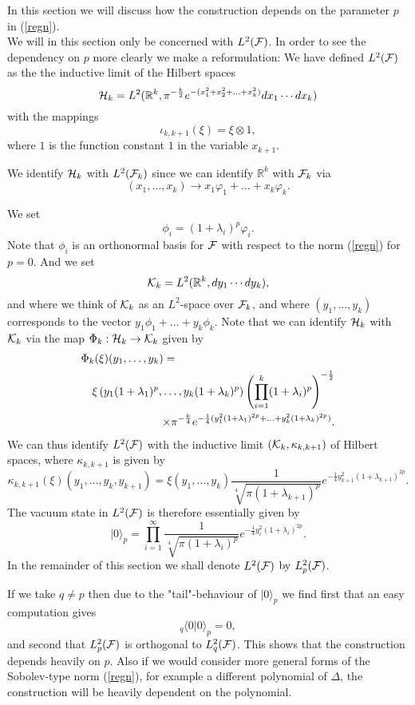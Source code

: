\documentclass[letterpaper,11pt]{article}
\def\cf{{\cal F}}
\def\ch{{\cal H}}
\def\ck{{\cal K}}
\newcommand{\cF}{{\cal F}}
\newcommand{\R}{\mathbb{ R}}
\begin{document}
In this section we will discuss how the construction depends on the parameter $p$ in (\ref{regn}). \\

We will in this section only be concerned with $L^2(\cf )$. In order to see the dependency on $p$ more clearly we make a reformulation: We have defined  $L^2(\cf )$ as the the inductive limit of the Hilbert spaces 
$$ \ch_k=L^2 (\mathbb{R}^k , \pi^{-\frac{k}{2}}e^{-(x_1^2+x_2^2+\ldots +x_k^2)}dx_1\cdots dx_k)$$
with the mappings 
$$ \iota_{k,k+1} (\xi)=\xi \otimes 1,$$
where $1$ is the function constant $1$ in the variable $x_{k+1}$. 

We identify $\ch_k$ with $L^2 (\cf_k)$ since we can identify $\mathbb{R}^k$ with $\cf_k$ via
$$(x_1,\ldots , x_k)\to  x_1\varphi_1+\ldots + x_k\varphi_k .$$

We set 
$$\phi_i =(1+\lambda_i)^p \varphi_i .$$
Note that  $\phi_i$ is an orthonormal basis for $\cf$   with respect to the norm (\ref{regn}) for $p=0$. And we set 
$$\ck_k=L^2 (\R^k, dy_1 \cdots dy_k)  ,$$
and where we think of $\ck_k$ as an $L^2$-space over $\cf_k$, and where $(y_1,\ldots , y_k)$ corresponds to the vector $y_1\phi_1+\ldots +y_k\phi_k$. Note that we can identify $\ch_k$ with $\ck_k $ via the map $\Phi_k:\ch_k \to \ck_k$ given by
\begin{eqnarray*}
\lefteqn{\Phi_k (\xi) (y_1, \ldots , y_k)=}\\
&& \xi \left(  y_1 (1+\lambda_1)^p, \ldots , y_k (1+\lambda_k)^p \right) \left(\prod_{i=1}^k(1+\lambda_i)^p \right)^{-\frac12}
\\&&\hspace{2,2cm}\times 
\pi^{-\frac{k}{4}}e^{-\frac14 (y_1 ^2(1+\lambda_1)^{2p}+ \ldots + y_k^2 (1+\lambda_k)^{2p})} .
\end{eqnarray*}
We can thus identify $L^2(\cF)$ with the inductive limit $(\ck_k,\kappa_{k,k+1} )$ of Hilbert spaces, where  $\kappa_{k,k+1}$ is given by 
$$\kappa_{k,k+1} (\xi)(y_1,\ldots , y_k,y_{k+1})=\xi(y_1,\ldots , y_k) \frac{1}{\sqrt[4]{\pi (1+\lambda_{k+1})^p}}e^{-\frac14 y_{k+1}^2(1+\lambda_{k+1})^{2p}} .$$
The vacuum state in $L^2(\cf)$ is therefore essentially   given by 
$$|0\rangle_p = \prod_{i=1}^\infty\frac{1}{\sqrt[4]{\pi (1+\lambda_{i})^p}}e^{-\frac14 y_{i}^2(1+\lambda_{i})^{2p}} .$$
In the remainder of this section we shall denote $L^2 (\cf)$ by $L^2_p (\cf)$.

If we take $q\not= p$ then due to the "tail"-behaviour of  $|0\rangle_p$ we find first that an easy computation gives   
$$_q\langle 0 |0\rangle_p =0,$$
and second that $L^2_p(\cf )$ is orthogonal to $L^2_q(\cf )$. 
This shows that the construction depends heavily on $p$. Also if we would consider more general forms of the Sobolev-type norm (\ref{regn}), for example a different polynomial of $\Delta$, the construction will be heavily dependent on the polynomial. 
\end{document}
